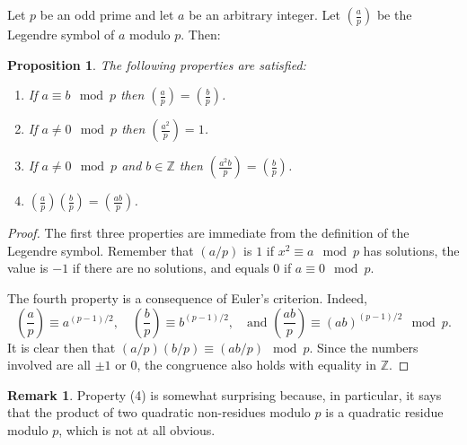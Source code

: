 \documentclass[12pt]{article}
\newtheorem*{prop}{Proposition}
\theoremstyle{definition}
\newtheorem*{rem}{Remark}
\begin{document}
Let $p$ be an odd prime and let $a$ be an arbitrary integer. Let $\displaystyle \left(\frac{a}{p}\right)$ be the Legendre symbol of $a$ modulo $p$. Then:

\begin{prop} The following properties are satisfied:
\begin{enumerate}
\item If $a\equiv b \mod p$ then $\displaystyle \left(\frac{a}{p}\right)=\left(\frac{b}{p}\right)$.

\item If $a\neq 0 \mod p$ then $\displaystyle \left(\frac{a^2}{p}\right)=1$.

\item If $a\neq 0 \mod p$ and $b\in \mathbb{Z}$ then $\displaystyle \left(\frac{a^2b}{p}\right)=\left(\frac{b}{p}\right)$.

\item $\displaystyle \left(\frac{a}{p}\right)\left(\frac{b}{p}\right)=\left(\frac{ab}{p}\right)$.
\end{enumerate}
\end{prop}

\begin{proof}
The first three properties are immediate from the definition of the Legendre symbol. Remember that $(a/p)$ is $1$ if $x^2\equiv a \mod p$ has solutions, the value is $-1$ if there are no solutions, and equals $0$ if $a\equiv 0 \mod p$.

The fourth property is a consequence of Euler's criterion. Indeed,
$$\left(\frac{a}{p}\right)\equiv a^{(p-1)/2},\quad \left(\frac{b}{p}\right)\equiv b^{(p-1)/2},\quad
\text{and } \left(\frac{ab}{p}\right)\equiv (ab)^{(p-1)/2} \mod
p.$$ It is clear then that $(a/p)(b/p)\equiv (ab/p) \mod p$. Since
the numbers involved are all $\pm 1$ or $0$, the congruence also
holds with equality in $\mathbb{Z}$.
\end{proof}

\begin{rem}
Property (4) is somewhat surprising because, in particular, it says that the product of two quadratic non-residues modulo $p$ is a quadratic residue modulo $p$, which is not at all obvious.
\end{rem}
\end{document}

